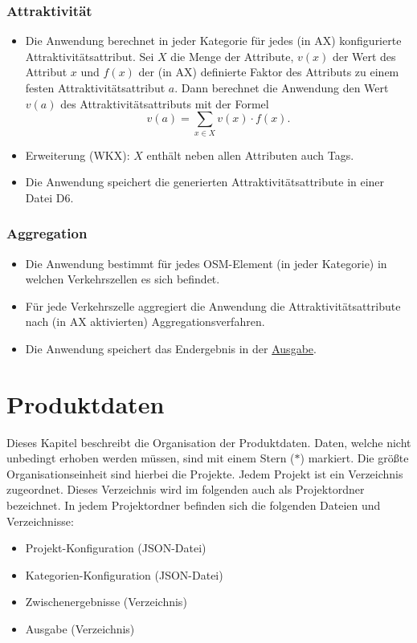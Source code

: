 \documentclass[parskip=full]{scrartcl} %
\begin{document}
\subsubsection*{Attraktivität}
\begin{itemize}
    \item Die Anwendung berechnet in jeder Kategorie für jedes (in AX) konfigurierte Attraktivitätsattribut. Sei $X$ die Menge der Attribute, $v(x)$ der Wert des Attribut $x$ und $f(x)$ der (in AX) definierte Faktor des Attributs zu einem festen Attraktivitätsattribut $a$. Dann berechnet die Anwendung den Wert $v(a)$ des Attraktivitätsattributs mit der Formel $$v(a)=\sum_{x\in X}{v(x)\cdot f(x)}.$$
    \item Erweiterung (WKX): $X$ enthält neben allen Attributen auch Tags.
    \item Die Anwendung speichert die generierten Attraktivitätsattribute in einer Datei D6.
\end{itemize}

\subsubsection*{Aggregation}
\begin{itemize}
    \item Die Anwendung bestimmt für jedes OSM-Element (in jeder Kategorie) in welchen Verkehrszellen es sich befindet.
    \item Für jede Verkehrszelle aggregiert die Anwendung die Attraktivitätsattribute nach (in AX aktivierten) Aggregationsverfahren.
    \item Die Anwendung speichert das Endergebnis in der \hyperlink{finalresult}{Ausgabe}.
\end{itemize}

\newpage





\section{Produktdaten} \hypertarget{data}{}
Dieses Kapitel beschreibt die Organisation der Produktdaten. Daten, welche nicht unbedingt erhoben werden müssen, sind mit einem Stern ($\ast$) markiert. Die größte Organisationseinheit sind hierbei die Projekte. Jedem Projekt ist ein Verzeichnis zugeordnet. Dieses Verzeichnis wird im folgenden auch als Projektordner bezeichnet. In jedem Projektordner befinden sich die folgenden Dateien und Verzeichnisse:
\begin{itemize}
    \item Projekt-Konfiguration (JSON-Datei)
    \item Kategorien-Konfiguration (JSON-Datei)
    \item Zwischenergebnisse (Verzeichnis)
    \item Ausgabe (Verzeichnis)
\end{itemize}
\end{document}

